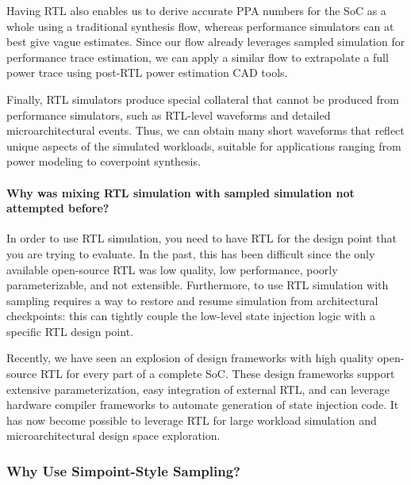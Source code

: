 \documentclass[sigplan,nonacm,10pt]{acmart}
\begin{document}
Having RTL also enables us to derive accurate PPA numbers for the SoC as a whole using a traditional synthesis flow, whereas performance simulators can at best give vague estimates.
Since our flow already leverages sampled simulation for performance trace estimation, we can apply a similar flow to extrapolate a full power trace using post-RTL power estimation CAD tools.

Finally, RTL simulators produce special collateral that cannot be produced from performance simulators, such as RTL-level waveforms and detailed microarchitectural events.
Thus, we can obtain many short waveforms that reflect unique aspects of the simulated workloads, suitable for applications ranging from power modeling to coverpoint synthesis.

\paragraph{Why was mixing RTL simulation with sampled simulation not attempted before?}


In order to use RTL simulation, you need to have RTL for the design point that you are trying to evaluate.
In the past, this has been difficult since the only available open-source RTL was low quality, low performance, poorly parameterizable, and not extensible.
Furthermore, to use RTL simulation with sampling requires a way to restore and resume simulation from architectural checkpoints: this can tightly couple the low-level state injection logic with a specific RTL design point.

Recently, we have seen an explosion of design frameworks with high quality open-source RTL for every part of a complete SoC\cite{chipyard, open_esp, openpiton, xiangshan, pulpv2}.
These design frameworks support extensive parameterization, easy integration of external RTL, and can leverage hardware compiler frameworks\cite{firrtl} to automate generation of state injection code.
It has now become possible to leverage RTL for large workload simulation and microarchitectural design space exploration.

\subsubsection{Why Use Simpoint-Style Sampling?}
\end{document}
